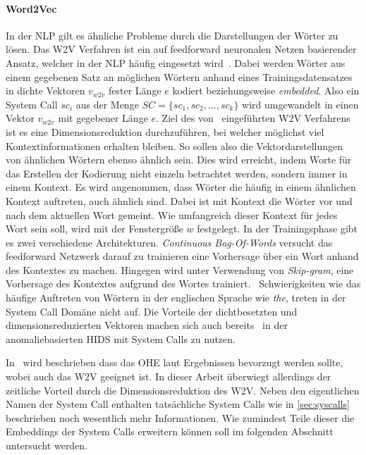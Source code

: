             \paragraph{Word2Vec}
                In der \ac{NLP} gilt es ähnliche Probleme durch die Darstellungen der Wörter zu lösen.
                Das \ac{W2V} Verfahren ist ein auf feedforward neuronalen Netzen basierender Ansatz, welcher in der \ac{NLP} häufig eingesetzt wird~\cite{W2VAYYADEVARA2018}.
                Dabei werden Wörter aus einem gegebenen Satz an möglichen Wörtern anhand eines Trainingsdatensatzes in dichte Vektoren $v_{w2v}$ fester Länge $e$ kodiert beziehungsweise \textit{embedded}.
                Also ein System Call $sc_i$ aus der Menge $SC = \{sc_1,sc_2,\dots,sc_k\}$ wird umgewandelt in einen Vektor $v_{w2v}$ mit gegebener Länge $e$.
                Ziel des von~\cite{W2VMIKOLOV2013} eingeführten \ac{W2V} Verfahrens ist es eine Dimensionsreduktion durchzuführen, bei welcher möglichst viel Kontextinformationen erhalten bleiben.
                So sollen also die Vektordarstellungen von ähnlichen Wörtern ebenso ähnlich sein.
                Dies wird erreicht, indem Worte für das Erstellen der Kodierung nicht einzeln betrachtet werden, sondern immer in einem Kontext.
                Es wird angenommen, dass Wörter die häufig in einem ähnlichen Kontext auftreten, auch ähnlich sind.
                Dabei ist mit Kontext die Wörter vor und nach dem aktuellen Wort gemeint.
                Wie umfangreich dieser Kontext für jedes Wort sein soll, wird mit der Fenstergröße $w$ festgelegt.
                In der Trainingsphase gibt es zwei verschiedene Architekturen.
                \textit{Continuous Bag-Of-Words} versucht das feedforward Netzwerk darauf zu trainieren eine Vorhersage über ein Wort anhand des Kontextes zu machen.
                Hingegen wird unter Verwendung von \textit{Skip-gram}, eine Vorhersage des Kontextes aufgrund des Wortes trainiert.~\cite{EMBEDDINGPILEHVAR2020}
                Schwierigkeiten wie das häufige Auftreten von Wörtern in der englischen Sprache wie \textit{the}, treten in der System Call Domäne nicht auf.
                Die Vorteile der dichtbesetzten und dimensionsreduzierten Vektoren machen sich auch bereits~\cite{IDSTHREADGRIMMER2021} in der anomaliebasierten \ac{HIDS} mit System Calls zu nutzen.

            In~\cite{W2VWUNDERLICH2019} wird beschrieben dass das \ac{OHE} laut Ergebnissen bevorzugt werden sollte, wobei auch das \ac{W2V} geeignet ist.
            In dieser Arbeit überwiegt allerdings der zeitliche Vorteil durch die Dimensionsreduktion des \ac{W2V}.
            Neben den eigentlichen Namen der System Call enthalten tatsächliche System Calls wie in \autoref{sec:syscalls} beschrieben noch wesentlich mehr Informationen.
            Wie zumindest Teile dieser die Embeddings der System Calls erweitern können soll im folgenden Abschnitt untersucht werden.

